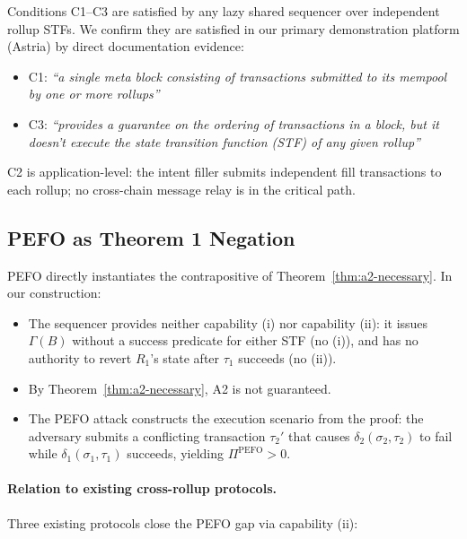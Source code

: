 \noindent Conditions C1--C3 are satisfied by any lazy shared sequencer over
independent rollup STFs. We confirm they are satisfied in our primary
demonstration platform (Astria) by direct documentation evidence:

\begin{itemize}
  \item C1: \emph{``a single meta block consisting of transactions submitted
    to its mempool by one or more rollups''}~\cite{Astria-TxFlow}
  \item C3: \emph{``provides a guarantee on the ordering of transactions in
    a block, but it doesn't execute the state transition function (STF) of
    any given rollup''}~\cite{Astria-TxFlow}
\end{itemize}

\noindent C2 is application-level: the intent filler submits independent
fill transactions to each rollup; no cross-chain message relay is in the
critical path.

\subsection{PEFO as Theorem 1 Negation}
\label{sec:pefo-negation}

PEFO directly instantiates the contrapositive of Theorem~\ref{thm:a2-necessary}.
In our construction:

\begin{itemize}
  \item The sequencer provides neither capability (i) nor capability (ii):
    it issues $\Gamma(B)$ without a success predicate for either STF (no (i)),
    and has no authority to revert $R_1$'s state after $\tau_1$ succeeds
    (no (ii)).
  \item By Theorem~\ref{thm:a2-necessary}, A2 is not guaranteed.
  \item The PEFO attack constructs the execution scenario from the proof:
    the adversary submits a conflicting transaction $\tau_2'$ that causes
    $\delta_2(\sigma_2, \tau_2)$ to fail while $\delta_1(\sigma_1, \tau_1)$
    succeeds, yielding $\Pi^{\mathrm{PEFO}} > 0$.
\end{itemize}

\paragraph{Relation to existing cross-rollup protocols.}
Three existing protocols close the PEFO gap via capability (ii):

